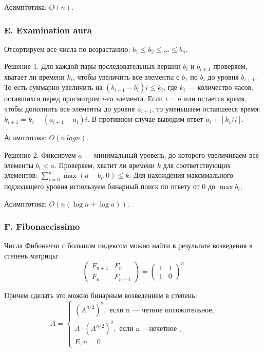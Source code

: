 Асимптотика: $O(n)$.

\subsubsection*{E. Examination aura}


Отсортируем все числа по возрастанию: $b_1 \leqslant b_2 \leqslant ... \leqslant b_n$.

Решение 1. Для каждой пары последовательных вершин $b_{i}$ и $b_{i+1}$ проверяем, хватает ли времени $k_i$, чтобы увеличить все элементы с $b_1$ по $b_i$ до уровня $b_{i+1}$. То есть суммарно увеличить на $(b_{i+1} - b_i) i \leqslant k_{i}$, где $k_{i}$  --- количество часов, оставшихся перед просмотром $i$-го элемента. Если $i = n$ или остается время, чтобы дополнить все элементы до уровня $a_{i+1}$, то уменьшаем оставшееся время: $k_{i+1} = k_i - (a_{i+1} - a_i) i$. В противном случае выводим ответ $a_i + [k_i / i]$.

Асимптотика: $O(n\ log n)$.

Решение 2. Фиксируем $a$ --- минимальный уровень, до которого увеличиваем все элементы $b_i < a$. Проверяем, хватит ли времени $k$ для соответствующих элементов: $\sum_{i = 0}^{n} \max(a - b_i, 0) \leqslant k$. Для нахождения максимального подходящего уровня используем бинарный поиск по ответу от 0 до $\max{b_i}$, 

Асимптотика: $O(n (\log n + \log a))$.

\subsubsection*{F. Fibonaccissimo}


Числа Фибоначчи с большим индексом можно найти в результате возведения в степень матрицы:
$$
\begin{pmatrix}
F_{n+1} & F_{n} \\
F_{n} & F_{n-1}
\end{pmatrix}
=
\begin{pmatrix}
1 & 1 \\
1 & 0
\end{pmatrix}^n
$$

Причем сделать это можно бинарным возведением в степень:
$$A =
\begin{cases}
\left(A^{n/2}\right)^2, \text{ если n --- четное положительное,} \\
A \cdot \left(A^{n/2}\right)^2, \text{ если n ---нечетное ,} \\
E, n = 0
\end{cases}
$$

